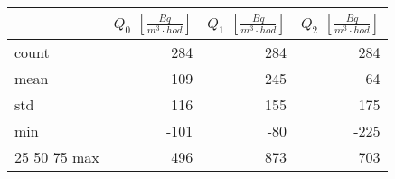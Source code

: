\begin{tabular}{lrrr}
\toprule
{} &  $Q_0$ $\left[\si{\frac{Bq}{m^3\cdot hod}}\right]$ &  $Q_1$ $\left[\si{\frac{Bq}{m^3\cdot hod}}\right]$ &  $Q_2$ $\left[\si{\frac{Bq}{m^3\cdot hod}}\right]$ \\
\midrule
count &                                                284 &                                                284 &                                                284 \\
mean  &                                                109 &                                                245 &                                                 64 \\
std   &                                                116 &                                                155 &                                                175 \\
min   &                                               -101 &                                                -80 &                                               -225 \\
25%
50%
75%
max   &                                                496 &                                                873 &                                                703 \\
\bottomrule
\end{tabular}
